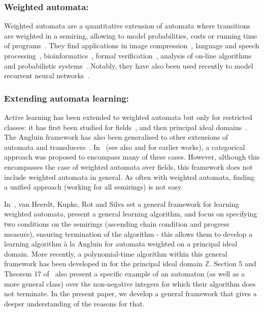 \documentclass[10pt,a4paper]{amsart}
\theoremstyle{definition}
\numberwithin{equation}{section}
\numberwithin{theorem}{section}
\begin{document}
\subsubsection*{\textbf{Weighted automata:}} Weighted automata are a quantitative extension of automata where transitions are weighted in a semiring, allowing to model probabilities, costs or running time of programs~\cite{Schutzenberger1961,Droste2009,DrosteK21}. They find applications in image compression~\cite{CK93,Culik1997}, language and speech processing~\cite{Mohri1997,MPR05}, bioinformatics~\cite{AMT08}, formal verification~\cite{Chatterjee2010,AKL11}, analysis of on-line algorithms \cite{Aminof2010} and probabilistic systems~\cite{Vardi85}. Notably, they have also been used recently to model recurrent neural networks~\cite{RLP19,OWSH20,ZDXML021,WZS22}.

\subsubsection*{\textbf{Extending automata learning:}} Active learning has been extended to weighted automata but only for restricted classes: it has first been studied for fields~\cite{BV96,BM15}, and then principal ideal domains~\cite{HKRS20}. The Angluin framework has also been generalised to other extensions of automata and transducers~\cite{V96,V00,BHKL09,BLN12,AF14,AEF15,BLN16,DD17,MSSKS17,HS020}. In~\cite{CPS21} (see also \cite{HSS17} \cite{BKR19} and \cite{US2020} for earlier works), a categorical approach was proposed to encompass many of these cases. However, although this encompasses the case of weighted automata over fields, this framework does not include weighted automata in general. As often with weighted automata, finding a unified approach (working for all semirings) is not easy.

In~\cite{HKRS20}, van Heerdt, Kupke, Rot and Silva set a general framework for learning weighted automata, present a general learning algorithm, and focus on specifying two conditions on the semirings (ascending chain condition and progress measure), ensuring termination of the algorithm - this allows them to develop a learning algorithm \`a la Angluin for automata weighted on a principal ideal domain. More recently, a polynomial-time algorithm within this general framework has been developed in \cite{BCSW24} for the principal ideal domain $\mathbb{Z}$. Section 5 and Theorem 17 of~\cite{HKRS20} also present a specific example of an automaton (as well as a more general class) over the non-negative integers for which their algorithm does not terminate. In the present paper, we develop a general framework that gives a deeper understanding of the reasons for that. 
\end{document}
